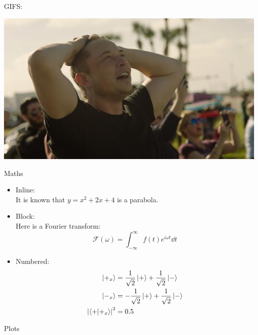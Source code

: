 \documentclass[10pt]{beamer}
\begin{document}
\begin{frame}
GIFS:
    \begin{figure}
\end{figure}
\end{frame}
\begin{frame}
\centering
    \includegraphics[width=\textwidth]{oohyeah}
\end{frame}
\begin{frame}{Maths}
\begin{itemize}
    \item Inline:\\
    It is known that $y=x^2+2x+4$ is a parabola.\par
    \item Block:\\
    Here is a Fourier transform:
    \[\mathcal{F}\left(\omega\right)=\int_{-\infty}^\infty f(t) e^{i\omega t}\dd t\]
    \item Numbered:
    \begin{subequations}
    \begin{align}
        \ket{+_x} &= \frac{1}{\sqrt{2}} \ket{+} + \frac{1}{\sqrt{2}} \ket{-}\\
        \ket{-_x} &= -\frac{1}{\sqrt{2}} \ket{+} + \frac{1}{\sqrt{2}} \ket{-}\\
        \abs{\braket{+}{+_x}}^2 &= 0.5
    \end{align}
    \end{subequations}
\end{itemize}


\end{frame}
\begin{frame}{Plots}
\centering
\end{frame}
\end{document}
